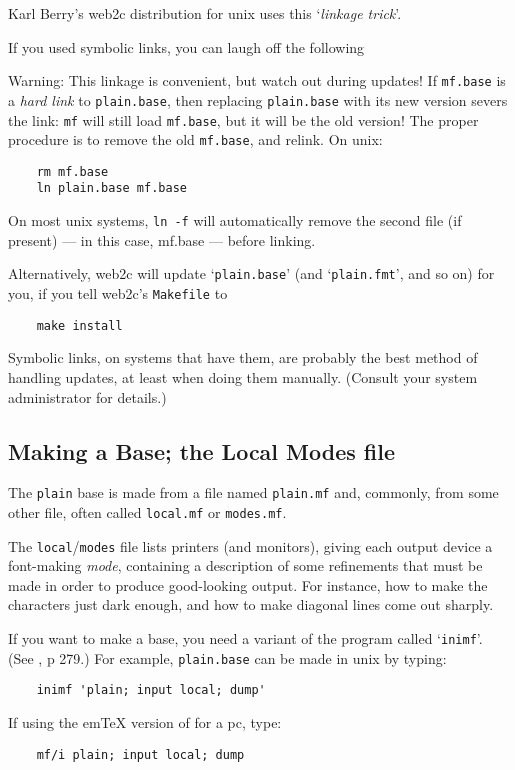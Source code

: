 Karl {\sc Berry\/}'s {\sf web2c} distribution for {\sc unix} uses
this `{\em linkage trick\/}'.

If you used symbolic links, you can laugh off the following

{\sc Warning:}
This linkage is convenient, but watch out during updates!
If {\tt mf.base} is a {\em hard link\/}
to {\tt plain.base}, then replacing {\tt plain.base} with its
new version severs the link:  {\tt mf} will still load {\tt mf.base},
but it will be the old version!  The proper procedure is to remove
the old {\tt mf.base}, and relink.  On {\sc unix}:
\begin{verbatim}
    rm mf.base
    ln plain.base mf.base
\end{verbatim}
On most {\sc unix\/} systems, {\tt ln -f} will automatically remove
the second file (if present) --- in this case, mf.base --- before linking.

Alternatively, {\sf web2c} will update `{\tt plain.base}'
(and `{\tt plain.fmt}', and so on) for you,
if you tell {\sf web2c\/}'s {\tt Makefile}  to
\begin{verbatim}
    make install
\end{verbatim}
Symbolic links, on systems that have them, are probably the best
method of handling updates, at least when doing them manually.
(Consult your system administrator for details.)


\subsection{Making a Base; the Local Modes file}\label{sub:modes}

The {\tt plain} base is made from a \MF{} file named
{\tt plain.mf} and, commonly, from some other file, often called
{\tt local.mf} or {\tt modes.mf}.

The {\tt local}/{\tt modes} file lists printers (and monitors), giving
each output device a font-making {\em mode\/}, containing a
description of some refinements that must be made in order to produce
good-looking output.  For instance, how to make the characters just
dark enough, and how to make diagonal lines come out sharply.

If you want to make a base, you need a variant of the \MF{} program
called `{\tt inimf}'.  (See \MFbook{}, p 279.)  For example,
{\tt plain.base} can be made in {\sc unix} by typing:
\begin{verbatim}
    inimf 'plain; input local; dump'
\end{verbatim}
If using the em\TeX{} version of \MF{} for a {\sc pc}, type:
\begin{verbatim}
    mf/i plain; input local; dump
\end{verbatim}


